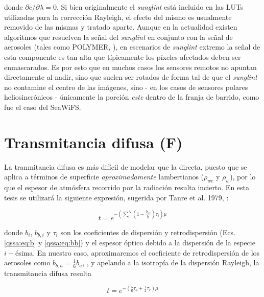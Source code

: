     \noindent donde $\partial c/\partial \lambda = 0$. Si bien originalmente el \textit{sunglint} está incluido en las LUTs utilizadas para la corrección Rayleigh, el efecto del mismo es usualmente removido de las mismas y tratado aparte. Aunque en la actualidad existen algoritmos que resuelven la señal del \textit{sunglint} en conjunto con la señal de aerosoles (tales como POLYMER, \cite{steinmetz2011}), en escenarios de \textit{sunglint} extremo la señal de esta componente es tan alta que típicamente los píxeles afectados deben ser enmascarados. Es por esto que en muchos casos los sensores remotos no apuntan directamente al nadir, sino que suelen ser rotados de forma tal de que el \textit{sunglint} no contamine el centro de las imágenes, sino - en los casos de sensores polares heliosincrónicos - únicamente la porción \textit{este} dentro de la franja de barrido, como fue el caso del SeaWiFS.

\section{Transmitancia difusa (F)}
\label{int:s:tDif}

    La tranmitancia difusa es más difícil de modelar que la directa, puesto que se aplica a términos de superficie \textit{aproximadamente} lambertianos ($\rho_{wc}$ y $\rho_{w}$), por lo que el espesor de atmósfera recorrido por la radiación resulta incierto. En esta tesis se utilizará la siguiente expresión, sugerida por Tanre et al. 1979, \cite{tanre1979}:
    
    \begin{equation}
        t = e^{-(\sum_{i}^{N}(1-\frac{b_{b,i}}{b_{i}})\tau_{i})\mu}
        \label{int:eq:tDif0}
    \end{equation}
    
    \noindent donde $b_{i}$, $b_{b,i}$ y $\tau_{i}$ son los coeficientes de dispersión y retrodispersión (Ecs. \ref{qssa:eq:b} y \ref{qssa:eq:bb}) y el espesor óptico debido a la dispersión de la especie $i-$ésima. En nuestro caso, aproximaremos el coeficiente de retrodispersión de los aerosoles como $b_{b,a} = \frac{1}{6}b_{a}$, \cite{tanre1979}, y apelando a la isotropía de la dispersión Rayleigh, la transmitancia difusa resulta

    \begin{equation}
        t = e^{-(\frac{5}{6}\tau_{a} + \frac{1}{2}\tau_{r})\mu}
        \label{int:eq:tDif}
    \end{equation}

